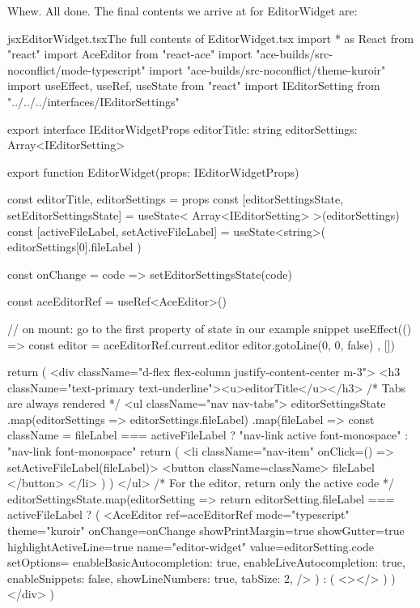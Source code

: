 \documentclass[paper=6in:9in,pagesize=pdftex,headinclude=on,footinclude=on,12pt]{scrbook}
\begin{document}
Whew. All done. The final contents we arrive at for EditorWidget are:

\begin{codeInput}{jsx}{EditorWidget.tsx}{The full contents of EditorWidget.tsx}
import * as React from "react"
import AceEditor from "react-ace"
import "ace-builds/src-noconflict/mode-typescript"
import "ace-builds/src-noconflict/theme-kuroir"
import { useEffect, useRef, useState } from "react"
import IEditorSetting from "../../../interfaces/IEditorSettings"

export interface IEditorWidgetProps {
  editorTitle: string
  editorSettings: Array<IEditorSetting>
}

export function EditorWidget(props: IEditorWidgetProps) {
  const { editorTitle, editorSettings } = props
  const [editorSettingsState, setEditorSettingsState] = useState<
    Array<IEditorSetting>
  >(editorSettings)
  const [activeFileLabel, setActiveFileLabel] = useState<string>(
    editorSettings[0].fileLabel
  )

  const onChange = code => {
    setEditorSettingsState(code)
  }

  const aceEditorRef = useRef<AceEditor>()

  // on mount: go to the first property of state in our example snippet
  useEffect(() => {
    const editor = aceEditorRef.current.editor
    editor.gotoLine(0, 0, false)
  }, [])

  return (
    <div className="d-flex flex-column justify-content-center m-3">
      <h3 className="text-primary text-underline"><u>{editorTitle}</u></h3>
      {/* Tabs are always rendered */}
      <ul className="nav nav-tabs">
        {editorSettingsState
          .map(editorSettings => editorSettings.fileLabel)
          .map(fileLabel => {
            const className =
              fileLabel === activeFileLabel
                ? "nav-link active font-monospace"
                : "nav-link font-monospace"
            return (
              <li className="nav-item" onClick={() => setActiveFileLabel(fileLabel)}>
                <button className={className}>
                  {fileLabel}
                </button>
              </li>
            )
          })}
      </ul>
      {/* For the editor, return only the active code */}
      {editorSettingsState.map(editorSetting => {
        return editorSetting.fileLabel === activeFileLabel ? (
          <AceEditor
            ref={aceEditorRef}
            mode="typescript"
            theme="kuroir"
            onChange={onChange}
            showPrintMargin={true}
            showGutter={true}
            highlightActiveLine={true}
            name="editor-widget"
            value={editorSetting.code}
            setOptions={{
              enableBasicAutocompletion: true,
              enableLiveAutocompletion: true,
              enableSnippets: false,
              showLineNumbers: true,
              tabSize: 2,
            }}
          />
        ) : (
          <></>
        )
      })}
    </div>
  )
}    
\end{codeInput}
\end{document}

